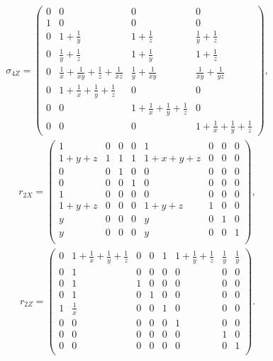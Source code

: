 \begin{align*}
\sigma_{4Z} =
\left(\begin{array}{c|ccc}
 0 & 0 & 0 & 0 \\
 1 & 0 & 0 & 0 \\
\hline
 0 & 1+\frac{1}{y} & 1+\frac{1}{z} & \frac{1}{y}+\frac{1}{z} \\
 0 & \frac{1}{y}+\frac{1}{z} & 1+\frac{1}{y} & 1+\frac{1}{z} \\
 0 & \frac{1}{x}+\frac{1}{x y}+\frac{1}{z}+\frac{1}{x z} & \frac{1}{y}+\frac{1}{x y} & \frac{1}{x y}+\frac{1}{y z} \\
 0 & 1+\frac{1}{x}+\frac{1}{y}+\frac{1}{z} & 0 & 0 \\
 0 & 0 & 1+\frac{1}{x}+\frac{1}{y}+\frac{1}{z} & 0 \\
 0 & 0 & 0 & 1+\frac{1}{x}+\frac{1}{y}+\frac{1}{z}
\end{array}\right),
\end{align*}
\begin{align*}
r_{2X} = 
\begin{pmatrix}
 1 & 0 & 0 & 0 & 1 & 0 & 0 & 0   \\
 1+y+z & 1 & 1 & 1 & 1+x+y+z & 0 & 0 & 0   \\
 0 & 0 & 1 & 0 & 0 & 0 & 0 & 0   \\
 0 & 0 & 0 & 1 & 0 & 0 & 0 & 0   \\
 1 & 0 & 0 & 0 & 0 & 0 & 0 & 0   \\
 1+y+z & 0 & 0 & 0 & 1+y+z & 1 & 0 & 0   \\
 y & 0 & 0 & 0 & y & 0 & 1 & 0   \\
 y & 0 & 0 & 0 & y & 0 & 0 & 1   \\
\end{pmatrix},
\end{align*}
\begin{align*}
r_{2Z} =
\begin{pmatrix}
 0 & 1+\frac{1}{x}+\frac{1}{y}+\frac{1}{z} & 0 & 0 & 1 & 1+\frac{1}{y}+\frac{1}{z} & \frac{1}{y} & \frac{1}{y} \\
 0 & 1 & 0 & 0 & 0 & 0 & 0 & 0 \\
 0 & 1 & 1 & 0 & 0 & 0 & 0 & 0 \\
 0 & 1 & 0 & 1 & 0 & 0 & 0 & 0 \\
 1 & \frac{1}{x} & 0 & 0 & 1 & 0 & 0 & 0 \\
 0 & 0 & 0 & 0 & 0 & 1 & 0 & 0 \\
 0 & 0 & 0 & 0 & 0 & 0 & 1 & 0 \\
 0 & 0 & 0 & 0 & 0 & 0 & 0 & 1 \\
\end{pmatrix}.
\end{align*}
